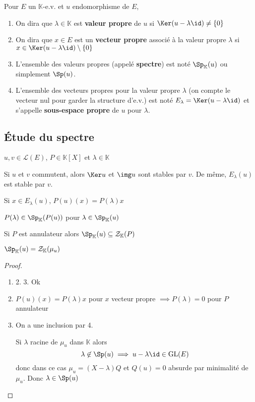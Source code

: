 \begin{dfn}
    Pour $E$ un $\mathbb K$-e.v. et $u$ endomorphisme de $E$, \begin{enumerate}
        \item On dira que $\lambda\in\mathbb K$ est \textbf{valeur propre} de $u$ si $\Ker(u-\lambda\id)\neq \{0\}$
        \item On dira que $x\in E$ est un \textbf{vecteur propre} associé à la valeur propre $\lambda$ si $x\in\Ker(u-\lambda\id)\setminus\{0\}$
        \item L'ensemble des valeurs propres (appelé \textbf{spectre}) est noté $\Sp_{\mathbb K}(u)$ ou simplement $\Sp(u)$.
        \item L'ensemble des vecteurs propres pour la valeur propre $\lambda$ (on compte le vecteur nul pour garder la structure d'e.v.) est noté $E_\lambda=\Ker(u-\lambda \id)$ et s'appelle \textbf{sous-espace propre} de $u$ pour $\lambda$.
    \end{enumerate}
\end{dfn}

\subsection{Étude du spectre}

\begin{prop}
    \Hyp $u, v\in\mathcal L(E)$, $P\in\mathbb K[X]$ et $\lambda\in\mathbb K$
    \begin{concenum}
    \item Si $u$ et $v$ commutent, alors $\Ker u$ et $\img u$ sont stables par $v$. De même, $E_\lambda(u)$ est stable par $v$.
    \item Si $x\in E_\lambda(u)$, $P(u)(x)=P(\lambda)x$
    \item $P(\lambda)\in\Sp_{\mathbb K}(P(u))$ pour $\lambda\in \Sp_{\mathbb K}(u)$
    \item Si $P$ est annulateur alors $\Sp_{\mathbb K}(u)\subseteq \mathcal Z_{\mathbb K}(P)$
    \item $\Sp_{\mathbb K}(u)=\mathcal Z_{\mathbb K}(\mu_u)$
    \end{concenum}
\end{prop}

\begin{proof}~ \begin{enumerate}
    \item 2. 3. Ok
    \setcounter{enumi}{3}
    \item $P(u)(x)=P(\lambda)x$ pour $x$ vecteur propre $\implies P(\lambda) = 0$ pour $P$ annulateur
    \item On a une inclusion par 4.

        Si $\lambda$ racine de $\mu_u$ dans $\mathbb K$ alors \[ \lambda \not\in\Sp(u)\implies u-\lambda\id \in \mathrm{GL}(E)
        \]
        donc dans ce cas $\mu_u=(X-\lambda) Q$ et $Q(u)=0$ absurde par minimalité de $\mu_u$. Donc $\lambda\in\Sp(u)$
\end{enumerate}
\end{proof}

